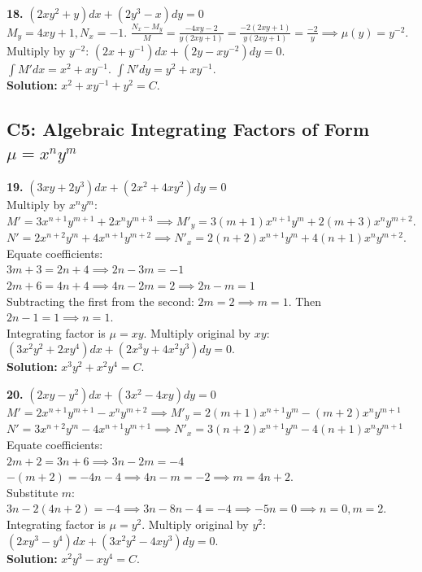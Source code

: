 \documentclass[11pt]{article}
\begin{document}
\vspace{0.5cm}
\textbf{18.} $(2xy^2 + y) dx + (2y^3 - x) dy = 0$ \\
$M_y = 4xy+1, N_x = -1$. $\frac{N_x - M_y}{M} = \frac{-4xy - 2}{y(2xy+1)} = \frac{-2(2xy+1)}{y(2xy+1)} = \frac{-2}{y} \implies \mu(y) = y^{-2}$. \\
Multiply by $y^{-2}$: $(2x + y^{-1}) dx + (2y - xy^{-2}) dy = 0$. \\
$\int M' dx = x^2 + xy^{-1}$. $\int N' dy = y^2 + xy^{-1}$. \\
\textbf{Solution:} $x^2 + xy^{-1} + y^2 = C$.

\subsection*{C5: Algebraic Integrating Factors of Form $\mu = x^n y^m$}

\textbf{19.} $(3xy + 2y^3) dx + (2x^2 + 4xy^2) dy = 0$ \\
Multiply by $x^n y^m$: \\
$M' = 3x^{n+1}y^{m+1} + 2x^n y^{m+3} \implies M'_y = 3(m+1)x^{n+1}y^m + 2(m+3)x^n y^{m+2}$. \\
$N' = 2x^{n+2}y^m + 4x^{n+1}y^{m+2} \implies N'_x = 2(n+2)x^{n+1}y^m + 4(n+1)x^n y^{m+2}$. \\
Equate coefficients: \\
$3m+3 = 2n+4 \implies 2n - 3m = -1$ \\
$2m+6 = 4n+4 \implies 4n - 2m = 2 \implies 2n - m = 1$ \\
Subtracting the first from the second: $2m = 2 \implies m = 1$. Then $2n - 1 = 1 \implies n = 1$. \\
Integrating factor is $\mu = xy$. Multiply original by $xy$: \\
$(3x^2 y^2 + 2xy^4) dx + (2x^3 y + 4x^2 y^3) dy = 0$. \\
\textbf{Solution:} $x^3 y^2 + x^2 y^4 = C$.

\vspace{0.5cm}
\textbf{20.} $(2xy - y^2) dx + (3x^2 - 4xy) dy = 0$ \\
$M' = 2x^{n+1}y^{m+1} - x^n y^{m+2} \implies M'_y = 2(m+1)x^{n+1}y^m - (m+2)x^n y^{m+1}$ \\
$N' = 3x^{n+2}y^m - 4x^{n+1}y^{m+1} \implies N'_x = 3(n+2)x^{n+1}y^m - 4(n+1)x^n y^{m+1}$ \\
Equate coefficients: \\
$2m+2 = 3n+6 \implies 3n - 2m = -4$ \\
$-(m+2) = -4n-4 \implies 4n - m = -2 \implies m = 4n+2$. \\
Substitute $m$: $3n - 2(4n+2) = -4 \implies 3n - 8n - 4 = -4 \implies -5n = 0 \implies n = 0, m = 2$. \\
Integrating factor is $\mu = y^2$. Multiply original by $y^2$: \\
$(2xy^3 - y^4) dx + (3x^2 y^2 - 4xy^3) dy = 0$. \\
\textbf{Solution:} $x^2 y^3 - x y^4 = C$.
\end{document}

